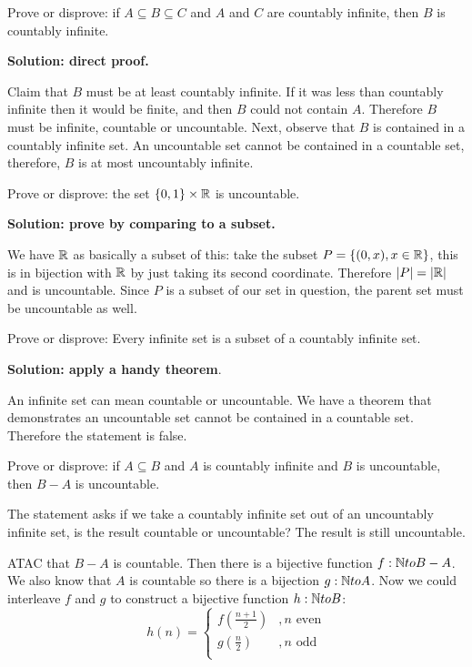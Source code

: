 \documentclass{article}
\begin{document}
\begin{problem}
Prove or disprove: if $A \subseteq B \subseteq C$ and $A$ and $C$ are countably infinite, then $B$ is countably infinite.
\end{problem}

\textbf{Solution: direct proof.}

Claim that $B$ must be at least countably infinite. If it was less than countably infinite then it would be finite, and then $B$ could not contain $A$. Therefore $B$ must be infinite, countable or uncountable. Next, observe that $B$ is contained in a countably infinite set. An uncountable set cannot be contained in a countable set, therefore, $B$ is at most uncountably infinite.

\begin{problem}
Prove or disprove: the set $\{0, 1\} \times \mathbb{R}$ is uncountable.
\end{problem}

\textbf{Solution: prove by comparing to a subset.}

We have $\mathbb{R}$ as basically a subset of this: take the subset $P = \{(0, x), x \in \mathbb{R}\}$, this is in bijection with $\mathbb{R}$ by just taking its second coordinate. Therefore $|P| = |\mathbb{R}|$ and is uncountable. Since $P$ is a subset of our set in question, the parent set must be uncountable as well.

\begin{problem}
Prove or disprove: Every infinite set is a subset of a countably infinite set.
\end{problem}

\textbf{Solution: apply a handy theorem}.

An infinite set can mean countable or uncountable. We have a theorem that demonstrates an uncountable set cannot be contained in a countable set. Therefore the statement is false.

\begin{problem}
Prove or disprove: if $A \subseteq B$ and $A$ is countably infinite and $B$ is uncountable, then $B - A$ is uncountable.
\end{problem}

The statement asks if we take a countably infinite set out of an uncountably infinite set, is the result countable or uncountable? The result is still uncountable.

ATAC that $B - A$ is countable. Then there is a bijective function $f: \mathbb{N} to B - A$. We also know that $A$ is countable so there is a bijection $g: \mathbb{N} to A$. Now we could interleave $f$ and $g$ to construct a bijective function $h: \mathbb{N} to B$:
$$h(n) = \begin{cases}
    f(\frac{n+1}{2}) & , n \text{ even} \\
    g(\frac{n}{2})   & , n \text{ odd}  \\
  \end{cases}$$
\end{document}
